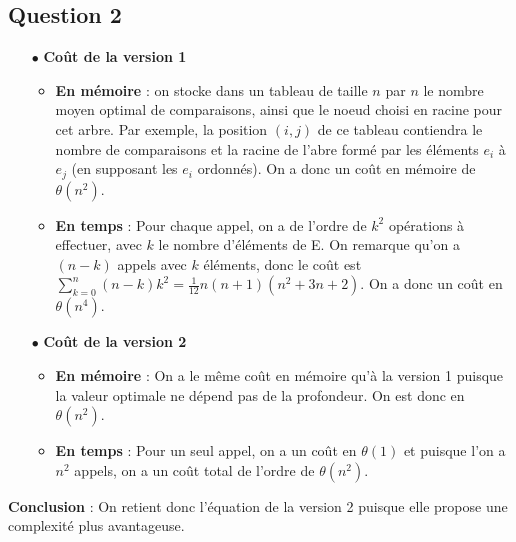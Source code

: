 \documentclass[a4paper, 10pt, french]{article}
\begin{document}
\subsection{Question 2}

\begin{itemize}
	\item[$\bullet$] \textbf{Coût de la version 1}
		\begin{itemize}
			\item \textbf{En mémoire} : on stocke dans un tableau de taille $n$ par $n$ le nombre moyen optimal de comparaisons, ainsi que le noeud choisi en racine pour cet arbre. 
				Par exemple, la position $(i, j)$ de ce tableau contiendra le nombre de comparaisons et la racine de l'abre formé par les éléments $e_i$ à $e_j$ 
				(en supposant les $e_i$ ordonnés). On a donc un coût en mémoire de $\theta(n^2)$. \\
			\item \textbf{En temps} : Pour chaque appel, on a de l'ordre de $k^2$ opérations à effectuer, avec $k$ le nombre d'éléments de E.
				On remarque qu'on a $(n - k)$ appels avec $k$ éléments, donc le coût est $\sum\limits_{k=0}^{n} (n-k)k^2 = \frac{1}{12}n(n+1)(n^2+3n+2)$.
				On a donc un coût en $\theta(n^4)$. \\
		\end{itemize}
	\item[$\bullet$] \textbf{Coût de la version 2}
		\begin{itemize}
			\item \textbf{En mémoire} : On a le même coût en mémoire qu'à la version 1 puisque la valeur optimale ne dépend pas de la profondeur. On est donc en $\theta(n^2)$.
			\item \textbf{En temps} : Pour un seul appel, on a un coût en $\theta(1)$ et puisque l'on a $n^2$ appels, on a un coût total de l'ordre de $\theta(n^2)$.\\
		\end{itemize}
\end{itemize}
\textbf{Conclusion} : On retient donc l'équation de la version 2 puisque elle propose une complexité plus avantageuse.
\end{document}
